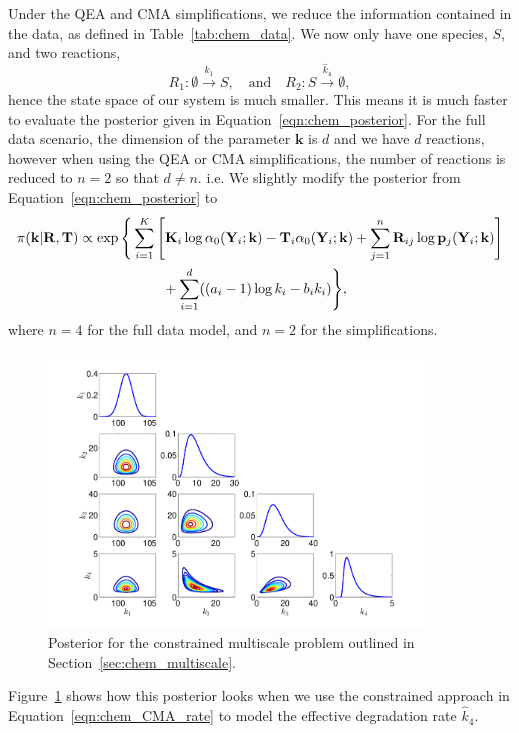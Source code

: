 \documentclass[final]{siamltex}
\begin{document}
Under the QEA and CMA simplifications, we reduce the information contained in the data, as defined in Table~\ref{tab:chem_data}. We now only have one species, $S$, and two reactions,
\[
	R_1\colon \emptyset \xrightarrow{k_1} S, \quad \text{and} \quad R_2\colon S \xrightarrow{\hat{k}_4} \emptyset,
\]
hence the state space of our system is much smaller. This means it is much faster to evaluate the posterior given in Equation~\eqref{eqn:chem_posterior}. For the full data scenario, the dimension of the parameter $\mathbf{k}$ is $d$ and we have $d$ reactions, however when using the QEA or CMA simplifications, the number of reactions is reduced to $n=2$ so that $d \neq n$. i.e. We slightly modify the posterior from Equation~\eqref{eqn:chem_posterior} to
\begin{align}
	\pi(\mathbf{k}|\mathbf{R}, \mathbf{T}) &\propto \exp\Bigg\{\sum\limits_{i=1}^K \Bigg[
				\mathbf{K}_i\log \alpha_0(\mathbf{Y}_i; \mathbf{k}) - \mathbf{T}_i\alpha_0(\mathbf{Y}_i; \mathbf{k})
				+\sum_{j=1}^{n} \mathbf{R}_{ij}\log\mathbf{p}_j(\mathbf{Y}_i; \mathbf{k})
			\Bigg]  \notag\\
		&	\qquad\qquad\qquad{} + \sum_{i=1}^d ((a_i-1)\log k_i - b_ik_i)\Bigg\}, \label{eqn:chem_QEA_posterior}
\end{align}
where $n=4$ for the full data model, and $n=2$ for the simplifications.

\begin{figure}[htb]
\centering
\includegraphics[width=0.9\textwidth]{"images/CMA_posterior"}
\caption{Posterior for the constrained multiscale problem outlined in Section~\ref{sec:chem_multiscale}.}
\label{fig:chem_CMA_posterior}
\end{figure}

Figure~\ref{fig:chem_CMA_posterior} shows how this posterior looks when we use the constrained approach in Equation~\eqref{eqn:chem_CMA_rate} to model the effective degradation rate $\hat{k}_4$.
\end{document}
